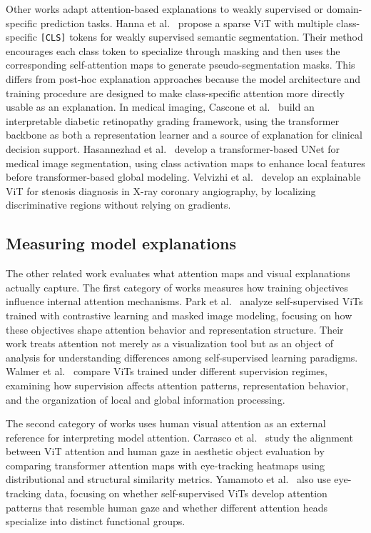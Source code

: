 \documentclass[lineno,pdflatex,sn-mathphys-num]{sn-jnl}%
\theoremstyle{thmstyleone}%
\theoremstyle{thmstyletwo}%
\theoremstyle{thmstylethree}%
\begin{document}
Other works adapt attention-based explanations to weakly supervised or domain-specific prediction tasks. Hanna et al.~\cite{Hanna25ICCV} propose a sparse ViT with multiple class-specific \texttt{[CLS]} tokens for weakly supervised semantic segmentation. Their method encourages each class token to specialize through masking and then uses the corresponding self-attention maps to generate pseudo-segmentation masks. This differs from post-hoc explanation approaches because the model architecture and training procedure are designed to make class-specific attention more directly usable as an explanation. In medical imaging, Cascone et al.~\cite{Cascone25ICCV} build an interpretable diabetic retinopathy grading framework, using the transformer backbone as both a representation learner and a source of explanation for clinical decision support. Hasannezhad et al.~\cite{Hasannezhad2025} develop a transformer-based UNet for medical image segmentation, using class activation maps to enhance local features before transformer-based global modeling. Velvizhi et al.~\cite{Velvizhi2026} develop an explainable ViT for stenosis diagnosis in X-ray coronary angiography, by localizing discriminative regions without relying on gradients. 

\subsection{Measuring model explanations}

The other related work evaluates what attention maps and visual explanations actually capture. The first category of works measures how training objectives influence internal attention mechanisms. Park et al.~\cite{park2023what} analyze self-supervised ViTs trained with contrastive learning and masked image modeling, focusing on how these objectives shape attention behavior and representation structure. Their work treats attention not merely as a visualization tool but as an object of analysis for understanding differences among self-supervised learning paradigms. Walmer et al.~\cite{Walmer23CVPR} compare ViTs trained under different supervision regimes, examining how supervision affects attention patterns, representation behavior, and the organization of local and global information processing. 

The second category of works uses human visual attention as an external reference for interpreting model attention. Carrasco et al.~\cite{Carrasco2026} study the alignment between ViT attention and human gaze in aesthetic object evaluation by comparing transformer attention maps with eye-tracking heatmaps using distributional and structural similarity metrics. Yamamoto et al.~\cite{Yamamoto2025} also use eye-tracking data, focusing on whether self-supervised ViTs develop attention patterns that resemble human gaze and whether different attention heads specialize into distinct functional groups. 
\end{document}
